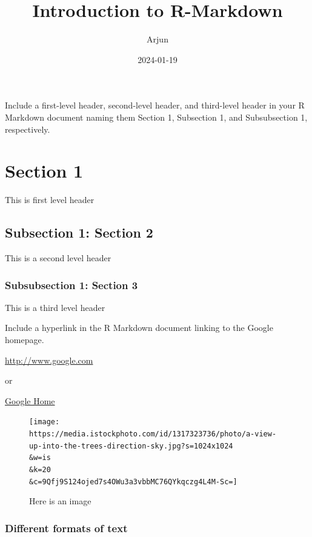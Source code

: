 \documentclass[
]{article}
\title{Introduction to R-Markdown}
\author{Arjun}
\date{2024-01-19}
\begin{document}
\maketitle

Include a first-level header, second-level header, and third-level
header in your R Markdown document naming them Section 1, Subsection 1,
and Subsubsection 1, respectively.

\hypertarget{section-1}{%
\section{Section 1}\label{section-1}}

This is first level header

\hypertarget{subsection-1-section-2}{%
\subsection{Subsection 1: Section 2}\label{subsection-1-section-2}}

This is a second level header

\hypertarget{subsubsection-1-section-3}{%
\subsubsection{Subsubsection 1: Section
3}\label{subsubsection-1-section-3}}

This is a third level header

Include a hyperlink in the R Markdown document linking to the Google
homepage.

\url{http://www.google.com}

or

\href{http://www.google.com}{Google Home}

\begin{figure}
\centering
\texttt{[image: https://media.istockphoto.com/id/1317323736/photo/a-view-up-into-the-trees-direction-sky.jpg?s=1024x1024\\\&w=is\\\&k=20\\\&c=9Qfj9S124ojed7s4OWu3a3vbbMC76QYkqczg4L4M-Sc=]}
\caption{Here is an image}
\end{figure}

\hypertarget{different-formats-of-text}{%
\subsubsection{Different formats of
text}\label{different-formats-of-text}}
\end{document}
